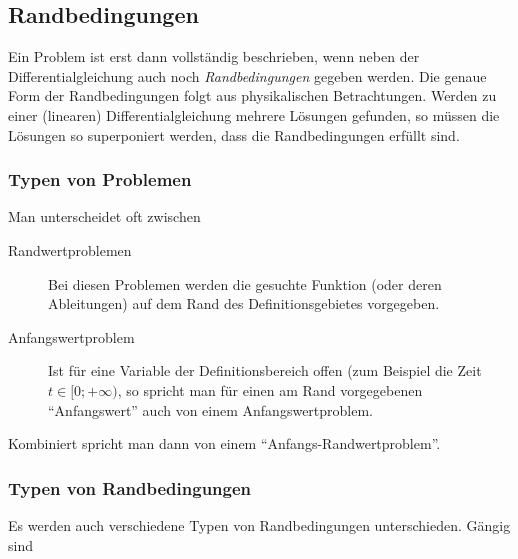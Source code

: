 \documentclass[paper=a4, fontsize=11.0pt, abstractoff, DIV12]{scrartcl}
\begin{document}
\subsection{Randbedingungen}

Ein Problem ist erst dann vollständig beschrieben, wenn neben der
Differentialgleichung auch noch \emph{Randbedingungen} gegeben werden. Die
genaue Form der Randbedingungen folgt aus physikalischen Betrachtungen.
Werden zu einer (linearen) Differentialgleichung mehrere Lösungen gefunden,
so müssen die Lösungen so superponiert werden, dass die Randbedingungen
erfüllt sind.

\subsubsection{Typen von Problemen}

Man unterscheidet oft zwischen
\begin{description}
    \item[Randwertproblemen] Bei diesen Problemen werden die gesuchte Funktion (oder deren Ableitungen) auf dem Rand des Definitionsgebietes vorgegeben.
    \item[Anfangswertproblem] Ist für eine Variable der Definitionsbereich
    offen (zum Beispiel die Zeit $t \in [0; +\infty)$, so spricht man für
    einen am Rand vorgegebenen ``Anfangswert'' auch von einem
    Anfangswertproblem.
\end{description}
Kombiniert spricht man dann von einem ``Anfangs-Randwertproblem''.

\subsubsection{Typen von Randbedingungen}

Es werden auch verschiedene Typen von Randbedingungen unterschieden. Gängig sind
\end{document}
